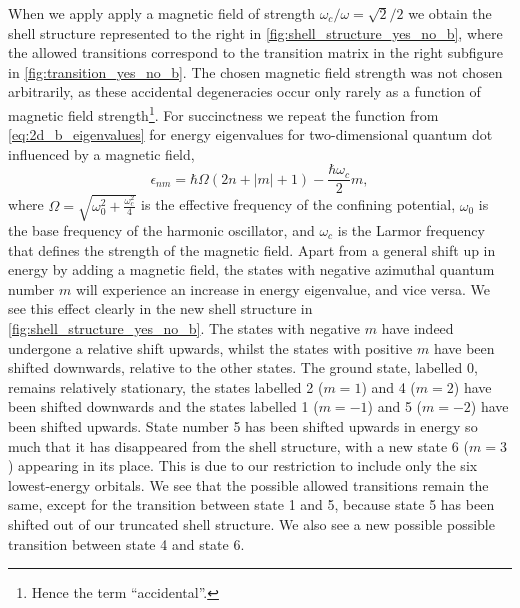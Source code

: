 When we apply apply a magnetic field of strength $\omega_c/\omega = \sqrt{2}/2$ we 
obtain the shell structure represented to the right in 
\autoref{fig:shell_structure_yes_no_b}, where the allowed transitions correspond to the 
transition matrix in the right subfigure in \autoref{fig:transition_yes_no_b}. The chosen magnetic field strength 
was not chosen arbitrarily, as these accidental degeneracies occur only rarely as 
a function of magnetic field strength\footnote{Hence the term ``accidental''.}.
For succinctness we repeat the function from \autoref{eq:2d_b_eigenvalues} for energy eigenvalues for two-dimensional 
quantum dot influenced by a magnetic field,
\begin{equation}
    \epsilon_{nm} = \hbar\Omega(2n + |m| + 1) - \frac{\hbar\omega_c}{2}m,
\end{equation}
where $\Omega = \sqrt{\omega_0^2 + \frac{\omega_c^2}{4}}$ is the effective 
frequency of the confining potential, $\omega_0$ is the base frequency of the 
harmonic oscillator, and $\omega_c$ is the Larmor frequency that defines the 
strength of the magnetic field.
Apart from a general shift up in energy by adding a magnetic field, the states with 
negative azimuthal quantum number $m$ will experience an increase in energy eigenvalue,
and vice versa. We see this effect clearly in the new shell structure in
\autoref{fig:shell_structure_yes_no_b}. The states with negative $m$ have indeed
undergone a relative shift upwards, whilst the states with positive $m$ have been
shifted downwards, relative to the other states. The ground state, labelled 0, 
remains relatively stationary, the states labelled 2 ($m=1$) and 4 ($m=2$) have been 
shifted downwards and the states labelled 1 ($m=-1$) and 5 ($m=-2$) have been shifted 
upwards. State number 5 has been shifted upwards in energy so much that it has disappeared
from the shell structure, with a 
new state 6 ($m=3$) appearing in its place. This is due to our restriction to include only the six
lowest-energy orbitals. We see that the possible allowed transitions remain the 
same, except for the transition between state 1 and 5, because state 5 has been shifted 
out of our truncated shell structure. We also see a new possible possible transition between
state 4 and state 6.

